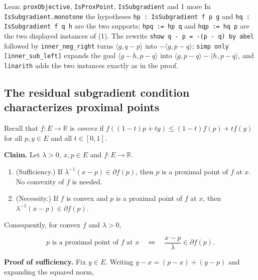 \documentclass[11pt,a4paper]{report}
\begin{document}
\begin{leanbox}{Lean: \texttt{proxObjective}, \texttt{IsProxPoint}, \texttt{IsSubgradient} and 1 more}
In \texttt{Is\allowbreak{}Subgradient.\allowbreak{}monotone} the hypotheses \texttt{hp : Is\allowbreak{}Subgradient f p g} and \texttt{hq : Is\allowbreak{}Subgradient f q h} are the two supports; \texttt{hpq := hp q} and \texttt{hqp := hq p} are the two displayed instances of (1). The rewrite \texttt{show q -\allowbreak{} p = -\allowbreak{}(p -\allowbreak{} q) by abel} followed by \texttt{inner\_\allowbreak{}neg\_\allowbreak{}right} turns \(\langle g,q-p\rangle\) into \(-\langle g,p-q\rangle\); \texttt{simp only [inner\_\allowbreak{}sub\_\allowbreak{}left]} expands the goal \(\langle g-h,p-q\rangle\) into \(\langle g,p-q\rangle-\langle h,p-q\rangle\), and \texttt{linarith} adds the two instances exactly as in the proof.
\end{leanbox}
\subsection{\texorpdfstring{The residual subgradient condition characterizes proximal points}{The residual subgradient condition characterizes proximal points}}
\label{report-step-ProximalLangevin-Proximal-lean-2}


Recall that \(f:E\to\mathbb R\) is \emph{convex} if \(f((1-t)p+ty)\le(1-t)f(p)+tf(y)\) for all \(p,y\in E\) and all \(t\in[0,1]\).




\textbf{Claim.} Let \(\lambda>0\), \(x,p\in E\) and \(f:E\to\mathbb R\).



\begin{enumerate}


\item (Sufficiency.) If \(\lambda^{-1}(x-p)\in\partial f(p)\), then \(p\) is a proximal point of \(f\) at \(x\). No convexity of \(f\) is needed.

\item (Necessity.) If \(f\) is convex and \(p\) is a proximal point of \(f\) at \(x\), then \(\lambda^{-1}(x-p)\in\partial f(p)\).

\end{enumerate}



Consequently, for convex \(f\) and \(\lambda>0\),


\[p\text{ is a proximal point of }f\text{ at }x\quad\Longleftrightarrow\quad\frac{x-p}{\lambda}\in\partial f(p).\]


\textbf{Proof of sufficiency.} Fix \(y\in E\). Writing \(y-x=(p-x)+(y-p)\) and expanding the squared norm,
\end{document}
